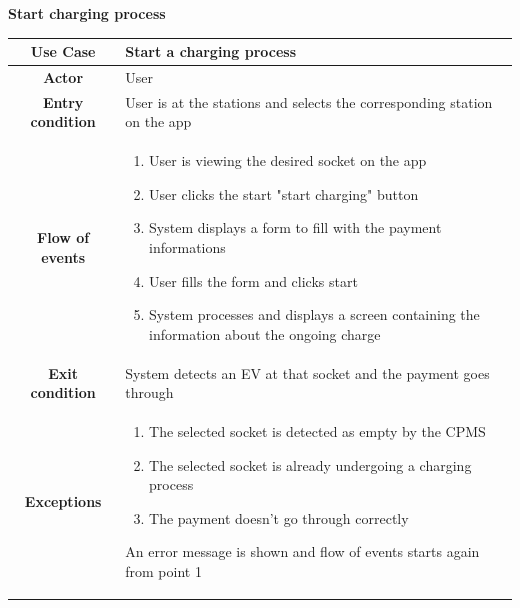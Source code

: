 \documentclass[table, 12pt]{article} %
\begin{document}
\begin{itemize}
             \begin{table}[H]
                \item[] \textbf{Start charging process}
                \item[]
                \centering
                \begin{tabular}{|c |m{}|}
                    \hline
                    \textbf{Use Case} & Start a charging process\\ \hline
                    \textbf{Actor} & User\\ \hline
                    \textbf{Entry condition} & User is at the stations and selects the corresponding station on the app \\  \hline
                    \textbf{Flow of events} & \begin{enumerate}
                                                \item User is viewing the desired socket on the app
                                                \item User clicks the start "start charging" button
                                                \item System displays a form to fill with the payment informations
                                                \item User fills the form and clicks start
                                                \item System processes and displays a screen containing the information about the ongoing charge
                                            \end{enumerate}\\ \hline
                    \textbf{Exit condition} &  System detects an EV at that socket and the payment goes through\\ \hline
                    \textbf{Exceptions} &  \begin{enumerate}
                        \item The selected socket is detected as empty by the CPMS
                        \item The selected socket is already undergoing a charging process
                        \item The payment doesn't go through correctly
                    \end{enumerate}
                    An error message is shown and flow of events starts again from point 1\\ \hline
                \end{tabular}
            \end{table}



\end{itemize}
\end{document}
